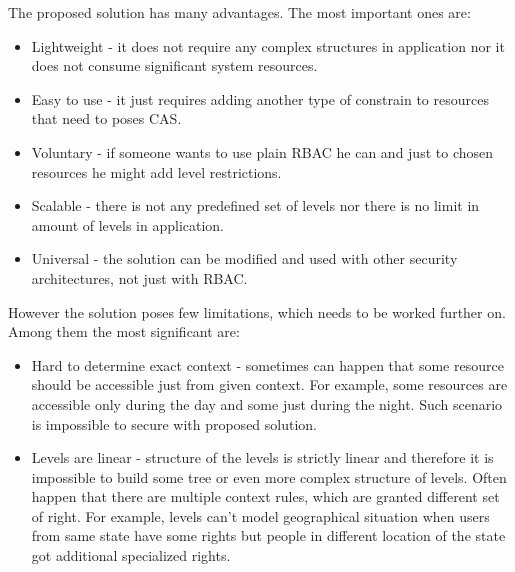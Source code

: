 \documentclass{sig-alternate}
\begin{document}
The proposed solution has many advantages. The most important ones are:

\begin{itemize}  
\setlength{\itemsep}{1pt}
	 \setlength{\parskip}{0pt}
  \setlength{\parsep}{0pt}
  \item Lightweight - it does not require any complex structures in application nor it does not consume significant system resources. 
  \item Easy to use - it just requires adding another type of constrain to resources that need to poses CAS.
  
  \item Voluntary - if someone wants to use plain RBAC he can and just to chosen resources he might add level restrictions. 
  
  \item Scalable - there is not any predefined set of levels nor there is no limit in amount of levels in application.
  
  \item Universal - the solution can be modified and used with other security architectures, not just with RBAC.
\end{itemize}

However the solution poses few limitations, which needs to be worked further on. Among them the most significant are:
\begin{itemize}
		\setlength{\itemsep}{1pt}
	 \setlength{\parskip}{0pt}
  \setlength{\parsep}{0pt}

  \item Hard to determine exact context - sometimes can happen that some resource should be accessible just from given context. For example, some resources are accessible only during the day and some just during the night. Such scenario is impossible to secure with proposed solution.
  
  \item Levels are linear - structure of the levels is strictly linear and therefore it is impossible to build some tree or even more complex structure of levels. Often happen that there are multiple context rules, which are granted different set of right. For example, levels can't model geographical situation when users from same state have some rights but people in different location of the state got additional specialized rights.
\end{itemize}
\end{document}
